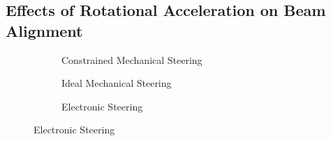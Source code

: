 \documentclass[fleqn,10pt]{wlscirep}
\begin{document}
\subsection*{Effects of Rotational Acceleration on Beam Alignment}

\begin{figure}[ht!]
    \centering
    \begin{subfigure}{0.3275\linewidth}
        
        \vspace{-25pt}
        \caption{Constrained Mechanical Steering}
        \label{fig:rot_exp_rate}
    \end{subfigure}
    \hfill
    \begin{subfigure}{0.3275\linewidth}
        
        \vspace{-25pt}
        \caption{Ideal Mechanical Steering}
        \label{fig:rot_sim_rate}
    \end{subfigure}
    \hfill
    \begin{subfigure}{0.3275\linewidth}
        
        \vspace{-25pt}
        \caption{Electronic Steering}
        \label{fig:rot_simfast_rate}
    \end{subfigure}

    \vspace{5 pt}

\end{figure}
\end{document}
